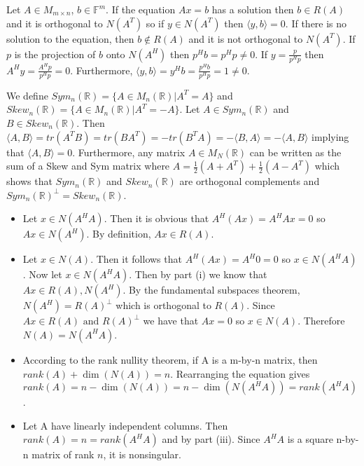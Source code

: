\documentclass[12pt]{article}
\newcommand{\R}{\mathbb{R}}
\newcommand{\F}{\mathbb{F}}
\newenvironment{problem}[2][Problem]{\begin{trivlist}
\item[\hskip \labelsep {\bfseries #1}\hskip \labelsep {\bfseries #2}]}{\end{trivlist}}
\begin{document}
\begin{problem}{44.} 
Let $A \in M_{m \times n}$, $b \in \F^m$. If the equation $Ax = b$ has a solution then $b \in R(A)$ and it is orthogonal to $N(A^T)$ so if $y \in N(A^T)$ then $\langle y ,b \rangle = 0$. If there is no solution to the equation, then $b \not\in R(A)$ and it is not orthogonal to $N(A^T)$. If $p$ is the projection of $b$ onto $N(A^H)$ then $p^Hb = p^Hp \neq 0$. If $y = \frac{p}{p^Hp}$ then $A^Hy = \frac{A^Hp}{p^Hp} = 0$. Furthermore, $\langle y ,b \rangle = y^Hb = \frac{p^Hb}{p^Hp} = 1 \neq 0$. 
\end{problem}

\begin{problem}{45.} 
We define $Sym_n(\R) = \{A \in M_n(\R) |A^T = A\}$ and $Skew_n(\R) = \{A \in M_n(\R) |A^T = -A\}$. Let $A \in Sym_n(\R)$ and $B \in Skew_n(\R)$. Then $\langle A, B \rangle = tr(A^TB) = tr(BA^T) = - tr(B^TA) =  - \langle B, A \rangle =  - \langle A, B \rangle $ implying that $\langle A, B \rangle = 0$. Furthermore, any matrix $A \in M_N(\R)$ can be written as the sum of a Skew and Sym matrix where $A = \frac{1}{2}(A + A^T) +  \frac{1}{2}(A - A^T)$ which shows that $Sym_n(\R)$ and $Skew_n(\R)$ are orthogonal complements and $Sym_n(\R)^\perp=Skew_n(\R)$.
\end{problem}

\begin{problem}{46.} \hfill
\begin{itemize}
\item [(i)]  Let $x \in N(A^HA)$. Then it is obvious that $A^H (Ax) = A^HAx = 0$ so $Ax \in N(A^H)$. By definition, $Ax \in R(A)$. 
\item [(ii)] Let $x\in N(A)$. Then it follows that $A^H(Ax) = A^H0= 0$ so $x \in N(A^HA)$. Now let $x \in N(A^HA)$. Then by part (i) we know that $Ax \in R(A), N(A^H)$. By the fundamental subspaces theorem,$N(A^H) = R(A)^\perp$ which is orthogonal to $R(A)$. Since $Ax \in R(A) \text{ and } R(A)^\perp$ we have that $Ax = 0$ so $x \in N(A)$. Therefore $N(A) = N(A^HA)$.     
\item [(iii)] According to the rank nullity theorem, if A is a m-by-n matrix, then $rank(A) +  \dim(N(A)) = n$. Rearranging the equation gives $rank(A) = n -  \dim(N(A)) =n -  \dim(N(A^HA)) =  rank(A^HA)$.
\item [(iv)] Let A have linearly independent columns. Then $rank(A) = n = rank(A^HA)$ and by part (iii). Since $A^HA$ is a square n-by-n matrix of rank $n$, it is nonsingular. 
\end{itemize} 
\end{problem}
\end{document}
